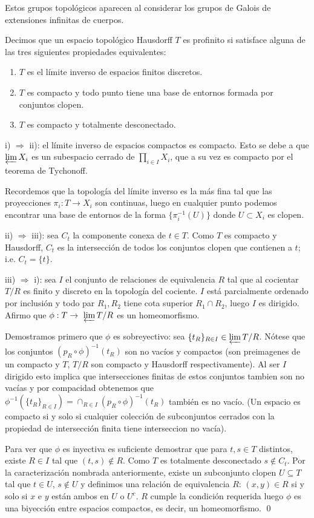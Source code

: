 \documentclass[a4paper,12pt, leqno]{report}
\begin{document}
Estos grupos topológicos aparecen al considerar los grupos de Galois de extensiones infinitas de cuerpos.
\begin{defprop} \label{prof1}
	Decimos que un espacio topológico Hausdorff $T$ es profinito si satisface alguna de las tres siguientes propiedades equivalentes:
	\begin{enumerate}[label=\roman*)]
		\item $T$ es el límite inverso de espacios finitos discretos.
		\item $T$ es compacto y todo punto tiene una base de entornos formada por conjuntos clopen. 
		\item $T$ es compacto y totalmente desconectado.
	\end{enumerate}
\end{defprop}
\begin{dem}
	
i) $\Rightarrow$ ii): el límite inverso de espacios compactos es compacto. Esto se debe a que $\varprojlim X_i$ es un subespacio cerrado de $\prod_{i \in I}X_i$, que a su vez es compacto por el teorema de Tychonoff. 

Recordemos que la topología del límite inverso es la más fina tal que las proyecciones $\pi_i: T \rightarrow X_i$ son continuas, luego en cualquier punto podemos encontrar una base de entornos de la forma $\{\pi_i^{-1}(U)\}$ donde $U\subset X_i$ es clopen. 

ii) $\Rightarrow$ iii): sea $C_t$ la componente conexa de $t \in T$. Como $T$ es compacto y Hausdorff, $C_t$ es la intersección de todos los conjuntos clopen que contienen a $t$; i.e. $C_t=\{t\}$.

iii) $\Rightarrow$ i): sea $I$ el conjunto de relaciones de equivalencia $R$ tal que al cocientar $T/R$ es finito y discreto en la topología del cociente. $I$ está parcialmente ordenado por inclusión y todo par $R_1,R_2$ tiene cota superior $R_1 \cap R_2$, luego $I$ es dirigido. Afirmo que $\phi: T \rightarrow \ \varprojlim T/R$ es un homeomorfismo. 

Demostramos primero que $\phi$ es sobreyectivo: sea $\{t_R\}_{R \in I} \in  \varprojlim T/R $. Nótese que los conjuntos $(p_R \circ \phi)^{-1}(t_R)$ son no vacíos y compactos (son preimagenes de un compacto y $T$, $T/R$ son compacto y Hausdorff respectivamente). Al ser $I$ dirigido esto implica que intersecciones finitas de estos conjuntos tambien son no vacías y por compacidad obtenemos que $\phi^{-1}(\{t_R\}_{R\in I})= \cap_{R \in I}(p_R \circ \phi)^{-1}(t_R)$ también es no vacío. (Un espacio es compacto si y solo si cualquier colección de subconjuntos cerrados con la propiedad de intersección finita tiene interseccion no vacía).

Para ver que $\phi$ es inyectiva es suficiente demostrar que para $t,s \in T$ distintos, existe $R \in I$ tal que $(t,s)\notin R$. Como $T$ es totalmente desconectado $s\notin C_t$. Por la caracterización nombrada anteriormente, existe un subconjunto clopen $U \subseteq T$ tal que $t\in U$, $s \notin U$ y definimos una relación de equivalencia $R$: $(x,y)\in R$ si y solo si $x$ e $y$ están ambos en $U$ o $U^c$. $R$ cumple la condición requerida luego $\phi$ es una biyección entre espacios compactos, es decir, un homeomorfismo. \qed
\end{dem}
\end{document}
